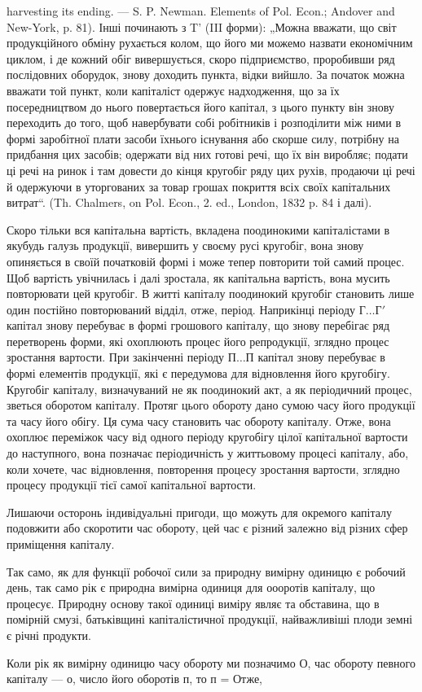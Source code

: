 \parcont{}  %
harvesting its ending. — S. P. Newman. Elements of Pol. Econ.; Andover
and New-York, p. 81). Інші починають з T' (III форми): „Можна вважати,
що світ продукційного обміну рухається колом, що його ми можемо
назвати економічним циклом, і де кожний обіг вивершується, скоро підприємство,
проробивши ряд послідовних оборудок, знову доходить пункта,
відки вийшло. За початок можна вважати той пункт, коли капіталіст
одержує надходження, що за їх посередництвом до нього повертається
його капітал, з цього пункту він знову переходить до того, щоб навербувати
собі робітників і розподілити між ними в формі заробітної плати
засоби їхнього існування або скорше силу, потрібну на придбання цих
засобів; одержати від них готові речі, що їх він виробляє; подати ці
речі на ринок і там довести до кінця кругобіг ряду цих рухів, продаючи
ці речі й одержуючи в уторгованих за товар грошах покриття всіх своїх
капітальних витрат“. (Th. Chalmers, on Pol. Econ., 2. ed., London, 1832 p.
84 і далі).

Скоро тільки вся капітальна вартість, вкладена поодинокими капіталістами
в якубудь галузь продукції, вивершить у своєму русі кругобіг,
вона знову опиняється в своїй початковій формі і може тепер повторити
той самий процес. Щоб вартість увічнилась і далі зростала, як капітальна
вартість, вона мусить повторювати цей кругобіг. В житті капіталу поодинокий
кругобіг становить лише один постійно повторюваний відділ,
отже, період. Наприкінці періоду $Г\dots{} Г'$ капітал знову перебуває в формі
грошового капіталу, що знову перебігає ряд перетворень форми, які
охоплюють процес його репродукції, зглядно процес зростання вартости.
При закінченні періоду $П\dots{} П$ капітал знову перебуває в формі елементів
продукції, які є передумова для відновлення його кругобігу. Кругобіг
капіталу, визначуваний не як поодинокий акт, а як періодичний процес,
зветься оборотом капіталу. Протяг цього обороту дано сумою часу
його продукції та часу його обігу. Ця сума часу становить час обороту
капіталу. Отже, вона охоплює переміжок часу від одного періоду кругобігу
цілої капітальної вартости до наступного, вона позначає періодичність
у життьовому процесі капіталу, або, коли хочете, час відновлення, повторення
процесу зростання вартости, зглядно процесу продукції тієї самої
капітальної вартости.

Лишаючи осторонь індивідуальні пригоди, що можуть для окремого
капіталу подовжити або скоротити час обороту, цей час є різний залежно
від різних сфер приміщення капіталу.

Так само, як для функції робочої сили за природну вимірну одиницю
є робочий день, так само рік є природна вимірна одиниця для оооротів капіталу,
що процесує. Природну основу такої одиниці виміру являє та обставина,
що в помірній смузі, батьківщині капіталістичної продукції, найважливіші
плоди земні є річні продукти.

Коли рік як вимірну одиницю часу обороту ми позначимо О, час
обороту певного капіталу — о, число його оборотів п, то п =  Отже,
\parbreak{}  %
